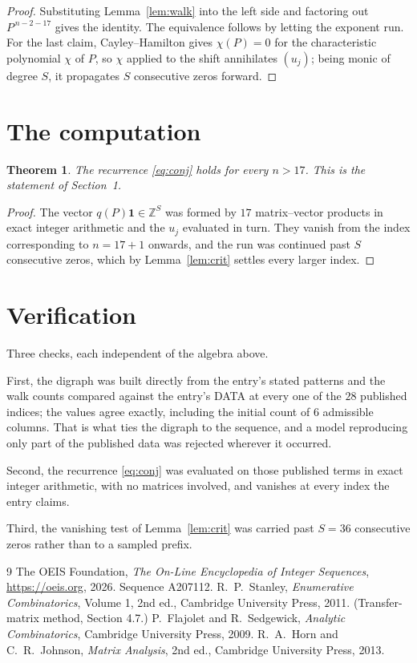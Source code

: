 \documentclass[11pt,a4paper]{article}
\theoremstyle{plain}
\newtheorem{theorem}{Theorem}
\theoremstyle{definition}
\begin{document}
\begin{proof}
Substituting Lemma~\ref{lem:walk} into the left side and factoring out
$P^{\,n-2-17}$ gives the identity. The equivalence follows by letting the exponent
run. For the last claim, Cayley--Hamilton gives $\chi(P)=0$ for the characteristic
polynomial $\chi$ of $P$, so $\chi$ applied to the shift annihilates $(u_j)$; being monic of
degree $S$, it propagates $S$ consecutive zeros forward.
\end{proof}

\section{The computation}

\begin{theorem}
The recurrence \eqref{eq:conj} holds for every $n>17$. This is the statement of
Section~1.
\end{theorem}

\begin{proof}
The vector $q(P)\mathbf{1}\in\mathbb{Z}^{S}$ was formed by $17$ matrix--vector
products in exact integer arithmetic and the $u_j$ evaluated in turn. They vanish from the
index corresponding to $n=17+1$ onwards, and the run was continued past $S$ consecutive
zeros, which by Lemma~\ref{lem:crit} settles every larger index.
\end{proof}

\section{Verification}

Three checks, each independent of the algebra above.

First, the digraph was built directly from the entry's stated patterns and the walk counts
compared against the entry's DATA at every one of the $28$ published indices; the
values agree exactly, including the initial count of $6$ admissible columns. That is
what ties the digraph to the sequence, and a model reproducing only part of the published
data was rejected wherever it occurred.

Second, the recurrence \eqref{eq:conj} was evaluated on those published terms in exact
integer arithmetic, with no matrices involved, and vanishes at every index the entry claims.

Third, the vanishing test of Lemma~\ref{lem:crit} was carried past $S=36$ consecutive
zeros rather than to a sampled prefix.

\begin{thebibliography}{9}
 The OEIS Foundation, \emph{The On-Line Encyclopedia of Integer
Sequences}, \url{https://oeis.org}, 2026. Sequence A207112.
 R.~P.~Stanley, \emph{Enumerative Combinatorics}, Volume 1, 2nd ed.,
Cambridge University Press, 2011. (Transfer-matrix method, Section 4.7.)
 P.~Flajolet and R.~Sedgewick, \emph{Analytic Combinatorics}, Cambridge
University Press, 2009.
 R.~A.~Horn and C.~R.~Johnson, \emph{Matrix Analysis}, 2nd ed., Cambridge
University Press, 2013.
\end{thebibliography}
\end{document}
